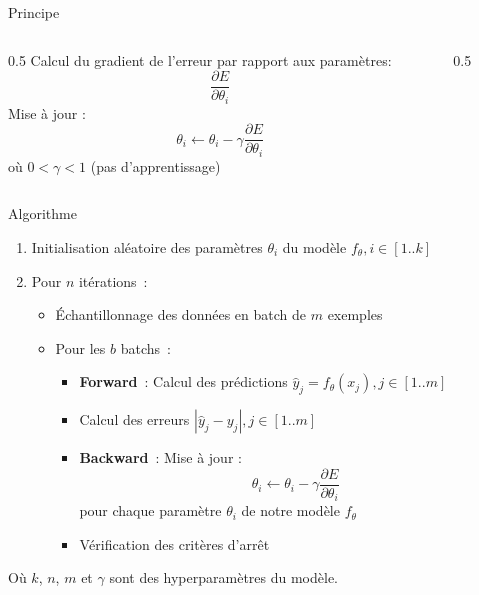 \begin{frame}{Principe}
  \begin{columns}
    \begin{column}{0.5\tw}
      Calcul du gradient de l'erreur par rapport aux paramètres:
      \[
        \frac{\partial{E}}{\partial{\theta_i}}
      \]
      Mise à jour :
      \[
        \theta_i \leftarrow \theta_i - \gamma\frac{\partial{E}}{\partial{\theta_i}}
      \]
      où $0 < \gamma < 1$ (pas d'apprentissage)
    \end{column}
    \begin{column}{0.5\tw}
    \end{column}
  \end{columns}
\end{frame}

\begin{frame}{Algorithme}
  \begin{enumerate}
    \item Initialisation aléatoire des paramètres $\theta_i$ du modèle $f_{\theta}, i\in[1..k]$
    \item Pour $n$ itérations~:
      \begin{itemize}
        \item Échantillonnage des données en batch de $m$ exemples
        \item Pour les $b$ batchs~:
        \begin{itemize}
          \item \textbf{Forward}~: Calcul des prédictions $\hat{y}_j = f_{\theta}(x_j), j\in[1..m]$
          \item Calcul des erreurs $|\hat{y}_j-y_j|, j\in[1..m]$
          \item \textbf{Backward}~: Mise à jour :
          \[
            \theta_i \leftarrow \theta_i - \gamma\frac{\partial{E}}{\partial{\theta_i}}
          \]
          pour chaque paramètre $\theta_i$ de notre modèle $f_\theta$ \\$\,$

          \item Vérification des critères d'arrêt
        \end{itemize}
      \end{itemize}
  \end{enumerate}

  Où $k$, $n$, $m$ et $\gamma$ sont des hyperparamètres du modèle.
\end{frame}

